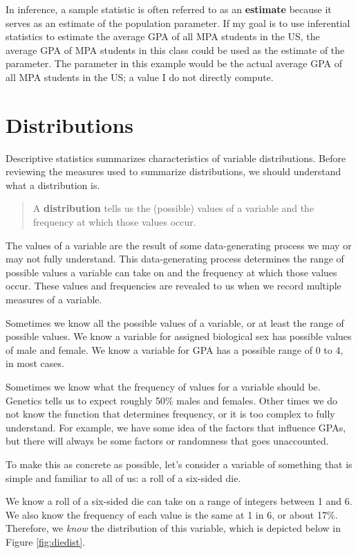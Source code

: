 \documentclass[
]{book}
\begin{document}
In inference, a sample statistic is often referred to as an \textbf{estimate} because it serves as an estimate of the population parameter. If my goal is to use inferential statistics to estimate the average GPA of all MPA students in the US, the average GPA of MPA students in this class could be used as the estimate of the parameter. The parameter in this example would be the actual average GPA of all MPA students in the US; a value I do not directly compute.

\hypertarget{distributions}{%
\section{Distributions}\label{distributions}}

Descriptive statistics summarizes characteristics of variable distributions. Before reviewing the measures used to summarize distributions, we should understand what a distribution is.

\begin{quote}
A \textbf{distribution} tells us the (possible) values of a variable and the frequency at which those values occur.
\end{quote}

The values of a variable are the result of some data-generating process we may or may not fully understand. This data-generating process determines the range of possible values a variable can take on and the frequency at which those values occur. These values and frequencies are revealed to us when we record multiple measures of a variable.

Sometimes we know all the possible values of a variable, or at least the range of possible values. We know a variable for assigned biological sex has possible values of male and female. We know a variable for GPA has a possible range of 0 to 4, in most cases.

Sometimes we know what the frequency of values for a variable should be. Genetics tells us to expect roughly 50\% males and females. Other times we do not know the function that determines frequency, or it is too complex to fully understand. For example, we have some idea of the factors that influence GPAs, but there will always be some factors or randomness that goes unaccounted.

To make this as concrete as possible, let's consider a variable of something that is simple and familiar to all of us: a roll of a six-sided die.

We know a roll of a six-sided die can take on a range of integers between 1 and 6. We also know the frequency of each value is the same at 1 in 6, or about 17\%. Therefore, we \emph{know} the distribution of this variable, which is depicted below in Figure \ref{fig:diedist}.
\end{document}
